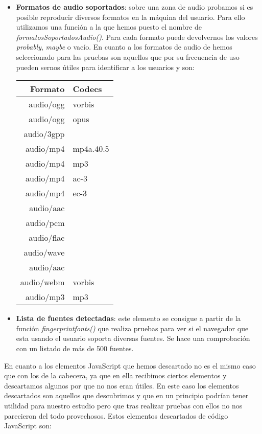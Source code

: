 \begin{itemize}
\begin{table}[H]
\begin{center}
\begin{tabular}{ r | l }
            \end{tabular}
        \end{center}
    \end{table}
    \item \textbf{Formatos de audio soportados}: sobre una zona de audio probamos si es posible reproducir diversos formatos en la máquina del usuario. Para ello utilizamos una función a la que hemos puesto el nombre de \textit{formatosSoportadosAudio()}. Para cada formato puede devolvernos los valores \textit{probably}, \textit{maybe} o vacío. En cuanto a los formatos de audio de hemos seleccionado para las pruebas son aquellos que por su frecuencia de uso pueden sernos útiles para identificar a los usuarios y son:
    \begin{table}[H]
        \begin{center}
            \begin{tabular}{ r | l }
            \textbf{Formato} & \textbf{Codecs} \\ \hline
            audio/ogg & vorbis \\
            audio/ogg & opus \\
            audio/3gpp \\
            audio/mp4 & mp4a.40.5 \\
            audio/mp4 & mp3 \\
            audio/mp4 & ac-3 \\
            audio/mp4 & ec-3 \\
            audio/aac \\
            audio/pcm \\
            audio/flac \\
            audio/wave \\
            audio/aac \\
            audio/webm & vorbis \\
            audio/mp3 & mp3 \\
            \end{tabular}
        \end{center}
    \end{table}
    \item \textbf{Lista de fuentes detectadas}: este elemento se consigue a partir de la función \textit{fingerprintfonts()} que realiza pruebas para ver si el navegador que esta usando el usuario soporta diversas fuentes. Se hace una comprobación con un listado de más de 500 fuentes.
\end{itemize}
En cuanto a los elementos JavaScript que hemos descartado no es el mismo caso que con los de la cabecera, ya que en ella recibimos ciertos elementos y descartamos algunos por que no nos eran útiles. En este caso los elementos descartados son aquellos que descubrimos y que en un principio podrían tener utilidad para nuestro estudio pero que tras realizar pruebas con ellos no nos parecieron del todo provechosos. Estos elementos descartados de código JavaScript son:
